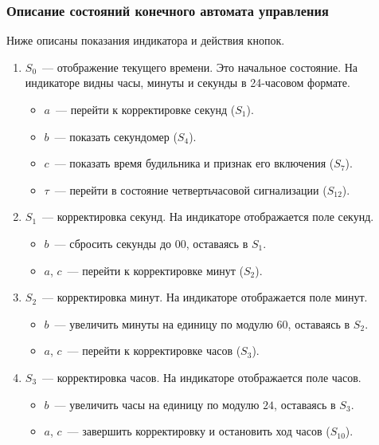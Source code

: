 \newpage
\subsubsection{Описание состояний конечного автомата управления}
\label{sec:states}

Ниже описаны показания индикатора и действия кнопок.

\begin{enumerate}[itemsep=0.3\baselineskip]
	\item $S_0$~--- отображение текущего времени. Это начальное состояние. На индикаторе видны часы, минуты и секунды в 24-часовом формате.
	\begin{itemize}
		\item $a$~--- перейти к корректировке секунд ($S_1$).
		\item $b$~--- показать секундомер ($S_4$).
		\item $c$~--- показать время будильника и признак его включения ($S_7$).
		\item $\tau$~--- перейти в состояние четвертьчасовой сигнализации ($S_{12}$).
	\end{itemize}

	\item $S_1$~--- корректировка секунд. На индикаторе отображается поле секунд.
	\begin{itemize}
		\item $b$~--- сбросить секунды до $00$, оставаясь в $S_1$.
		\item $a$, $c$~--- перейти к корректировке минут ($S_2$).
	\end{itemize}

	\item $S_2$~--- корректировка минут. На индикаторе отображается поле минут.
	\begin{itemize}
		\item $b$~--- увеличить минуты на единицу по модулю $60$, оставаясь в $S_2$.
		\item $a$, $c$~--- перейти к корректировке часов ($S_3$).
	\end{itemize}

	\item $S_3$~--- корректировка часов. На индикаторе отображается поле часов.
	\begin{itemize}
		\item $b$~--- увеличить часы на единицу по модулю $24$, оставаясь в $S_3$.
		\item $a$, $c$~--- завершить корректировку и остановить ход часов ($S_{10}$).
	\end{itemize}


\end{enumerate}
